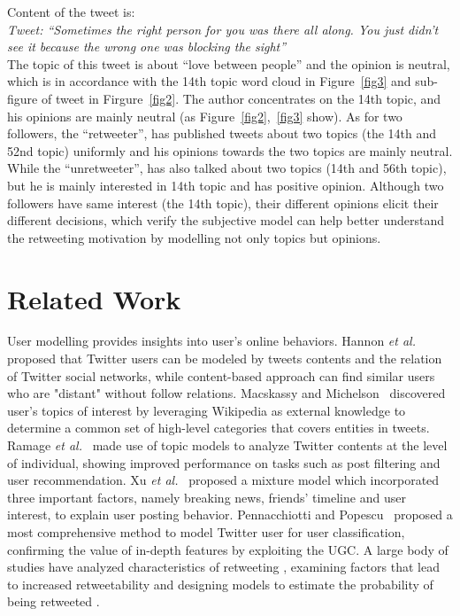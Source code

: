 \documentclass[letterpaper]{article}
\begin{document}
Content of the tweet is:\\
\textit{Tweet: ``Sometimes the right person for you was there all along. You just didn't see it because the wrong one was blocking the sight''} \\
The topic of this tweet is about ``love between people'' and the opinion is neutral, which is in accordance with the 14th topic word cloud in Figure~\ref{fig3} and sub-figure of tweet in Firgure~\ref{fig2}.
The author concentrates on the 14th topic, and his opinions are mainly neutral (as Figure~\ref{fig2},~\ref{fig3} show).
As for two followers, the ``retweeter'', has published tweets about two topics (the 14th and 52nd topic) uniformly and his opinions towards the two topics are mainly neutral.
While the ``unretweeter'', has also talked about two topics (14th and 56th topic), but he is mainly interested in 14th topic and has positive opinion.
Although two followers have same interest (the 14th topic), their different opinions elicit their different decisions, which verify the subjective model can help better understand the retweeting motivation by modelling not only topics but opinions.

\section{Related Work}
\label{relatedwork}
   
User modelling provides insights into user's online behaviors. 
Hannon \emph{et al.}~ proposed that Twitter users can be modeled by tweets contents and the relation of Twitter social networks, while content-based approach can find similar users who are "distant" without follow relations. 
Macskassy and Michelson~ discovered user's topics of interest by leveraging Wikipedia as external knowledge to determine a common set of high-level categories that covers entities in tweets. 
Ramage \emph{et al.}~ made use of topic models to analyze Twitter contents at the level of individual, showing improved performance on tasks such as post filtering and user recommendation. 
Xu \emph{et al.}~ proposed a mixture model which incorporated three important factors, namely breaking news, friends' timeline and user interest, to explain user posting behavior.
Pennacchiotti and Popescu~ proposed a most comprehensive method to model Twitter user for user classification, confirming the value of in-depth features by exploiting the UGC.
A large body of studies have analyzed characteristics of retweeting \cite{conf/icwsm/MacskassyM11,Starbird:2012RRI}, examining factors that lead to increased retweetability \cite{Suh2010,Comarela:2012UFA} and designing models to estimate the probability of being retweeted \cite{Osborne_Lavrenko_2011,Jenders:2013APV,conf/icwsm/PfitznerGS12}.
\end{document}
